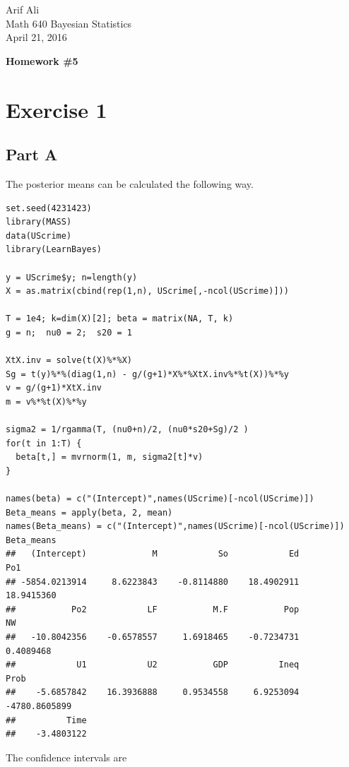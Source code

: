 \documentclass{article}\usepackage[]{graphicx}\usepackage[]{color}
\makeatletter
\newenvironment{kframe}{%
 \def\at@end@of@kframe{}%
 \ifinner\ifhmode%
  \def\at@end@of@kframe{\end{minipage}}%
  \begin{minipage}{\columnwidth}%
 \fi\fi%
 \def\FrameCommand##1{\hskip\@totalleftmargin \hskip-\fboxsep
 \colorbox{shadecolor}{##1}\hskip-\fboxsep
     \hskip-\linewidth \hskip-\@totalleftmargin \hskip\columnwidth}%
 \MakeFramed {\advance\hsize-\width
   \@totalleftmargin\z@ \linewidth\hsize
   \@setminipage}}%
 {\par\unskip\endMakeFramed%
 \at@end@of@kframe}
\newenvironment{knitrout}{}{} %
\makeatother
\begin{document}
\begin{flushright}
Arif Ali\\
Math 640 Bayesian Statistics\\
April 21, 2016\\
\end{flushright}

\begin{center}
\LARGE\textbf{Homework \#5}
  \end{center}
  \section*{Exercise 1}
  \subsection*{Part A}
The posterior means can be calculated the following way.
\begin{knitrout}
\color{fgcolor}\begin{kframe}
\begin{verbatim}
set.seed(4231423)
library(MASS)
data(UScrime)
library(LearnBayes)

y = UScrime$y; n=length(y)
X = as.matrix(cbind(rep(1,n), UScrime[,-ncol(UScrime)]))

T = 1e4; k=dim(X)[2]; beta = matrix(NA, T, k)
g = n;  nu0 = 2;  s20 = 1

XtX.inv = solve(t(X)%*%X)
Sg = t(y)%*%(diag(1,n) - g/(g+1)*X%*%XtX.inv%*%t(X))%*%y
v = g/(g+1)*XtX.inv
m = v%*%t(X)%*%y

sigma2 = 1/rgamma(T, (nu0+n)/2, (nu0*s20+Sg)/2 )
for(t in 1:T) {
  beta[t,] = mvrnorm(1, m, sigma2[t]*v)
}

names(beta) = c("(Intercept)",names(UScrime)[-ncol(UScrime)])
Beta_means = apply(beta, 2, mean)
names(Beta_means) = c("(Intercept)",names(UScrime)[-ncol(UScrime)])
Beta_means
##   (Intercept)             M            So            Ed           Po1 
## -5854.0213914     8.6223843    -0.8114880    18.4902911    18.9415360 
##           Po2            LF           M.F           Pop            NW 
##   -10.8042356    -0.6578557     1.6918465    -0.7234731     0.4089468 
##            U1            U2           GDP          Ineq          Prob 
##    -5.6857842    16.3936888     0.9534558     6.9253094 -4780.8605899 
##          Time 
##    -3.4803122
\end{verbatim}
\end{kframe}
\end{knitrout}
The confidence intervals are
\end{document}

